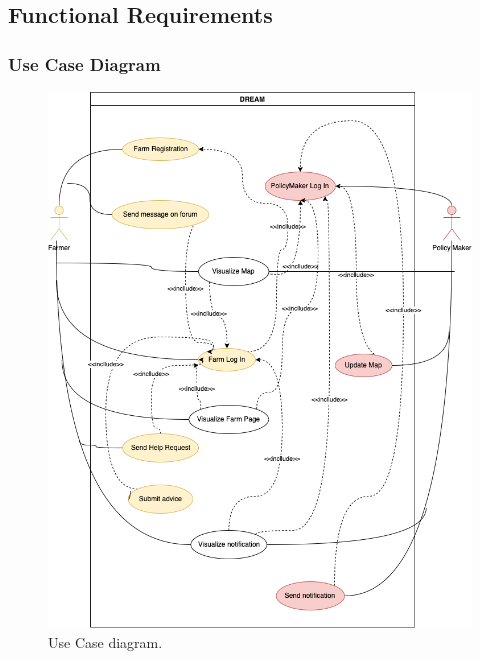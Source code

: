 \newpage

\subsection{Functional Requirements}
\subsubsection{Use Case Diagram}
\begin{figure}[H]
    \begin{center}
    \includegraphics[width=1\textwidth]{images/useCaseDiag.drawio.png}
    \caption{Use Case diagram.}
    \label{fig:state9}
    \end{center}
\end{figure}
